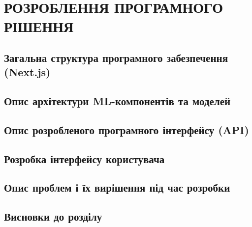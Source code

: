\chapter{РОЗРОБЛЕННЯ ПРОГРАМНОГО РІШЕННЯ}

\section{Загальна структура програмного забезпечення (Next.js)}
\section{Опис архітектури ML-компонентів та моделей}
\section{Опис розробленого програмного інтерфейсу (API)}
\section{Розробка інтерфейсу користувача}
\section{Опис проблем і їх вирішення під час розробки}
\section{Висновки до розділу}

